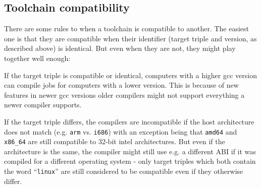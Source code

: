 \documentclass[a4paper,9pt]{scrartcl}
\begin{document}
\subsection{Toolchain compatibility}

There are some rules to when a toolchain is compatible to another. The easiest one is that they are compatible when their identifier (target triple and version, as described above) is identical. But even when they are not, they might play together well enough:

If the target triple is compatible or identical, computers with a higher gcc version can compile jobs for computers with a lower version. This is because of new features in newer gcc versions older compilers might not support everything a newer compiler supports.

If the target triple differs, the compilers are incompatible if the host architecture does not match (e.g. \texttt{arm} vs. \texttt{i686}) with an exception being that \texttt{amd64} and \texttt{x86\_64} are still compatible to 32-bit intel architectures. But even if the architecture is the same, the compiler might still use e.g. a different ABI if it was compiled for a different operating system - only target triples which both contain the word ``\texttt{linux}'' are still considered to be compatible even if they otherwise differ.
\end{document}
